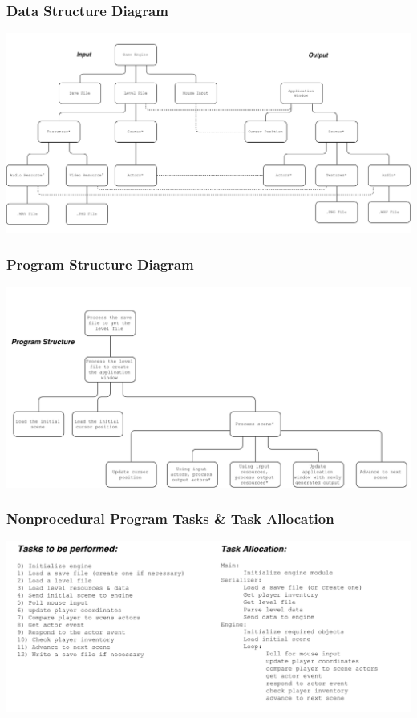 \documentclass{article}
\begin{document}
		\subsubsection{Data Structure Diagram}
			\begin{center}
				\includegraphics[scale=0.45,angle=90]{Jackson1.png}
			\end{center}
		\subsubsection{Program Structure Diagram}
			\begin{center}
				\includegraphics[scale=0.26,angle=90]{Jackson2.png}
			\end{center}
		\subsubsection{Nonprocedural Program Tasks \& Task Allocation}
			\begin{center}
				\includegraphics[scale=0.74,angle=90]{Jackson34.png}
			\end{center}
\end{document}
